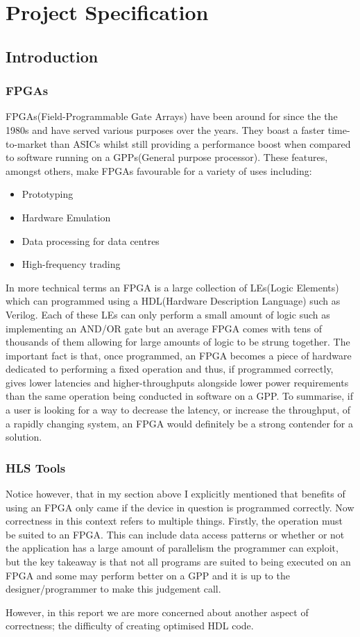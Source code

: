 \chapter{Project Specification}

\section{Introduction}
\subsection{FPGAs}
FPGAs(Field-Programmable Gate Arrays) have been around for since the the 1980s and have served various purposes over the years. They boast a faster time-to-market than ASICs whilst still providing a performance boost when compared to software running on a GPPs(General purpose processor). These features, amongst others, make FPGAs favourable for a variety of uses including:
\begin{itemize}
    \item Prototyping
    \item Hardware Emulation
    \item Data processing for data centres
    \item High-frequency trading
 \end{itemize}

In more technical terms an FPGA is a large collection of LEs(Logic Elements) which can programmed using a HDL(Hardware Description Language) such as Verilog. Each of these LEs can only perform a small amount of logic such as implementing an AND/OR gate but an average FPGA comes with tens of thousands of them allowing for large amounts of logic to be strung together. The important fact is that, once programmed, an FPGA becomes a piece of hardware dedicated to performing a fixed operation and thus, if programmed correctly, gives lower latencies and higher-throughputs alongside lower power requirements than the same operation being conducted in software on a GPP. To summarise, if a user is looking for a way to decrease the latency, or increase the throughput, of a rapidly changing system, an FPGA would definitely be a strong contender for a solution. 

\subsection{HLS Tools}
Notice however, that in my section above I explicitly mentioned that benefits of using an FPGA only came if the device in question is programmed correctly. Now correctness in this context refers to multiple things. Firstly, the operation must be suited to an FPGA. This can include data access patterns or whether or not the application has a large amount of parallelism the programmer can exploit, but the key takeaway is that not all programs are suited to being executed on an FPGA and some may perform better on a GPP and it is up to the designer/programmer to make this judgement call.

However, in this report we are more concerned about another aspect of correctness; the difficulty of creating optimised HDL code.



 